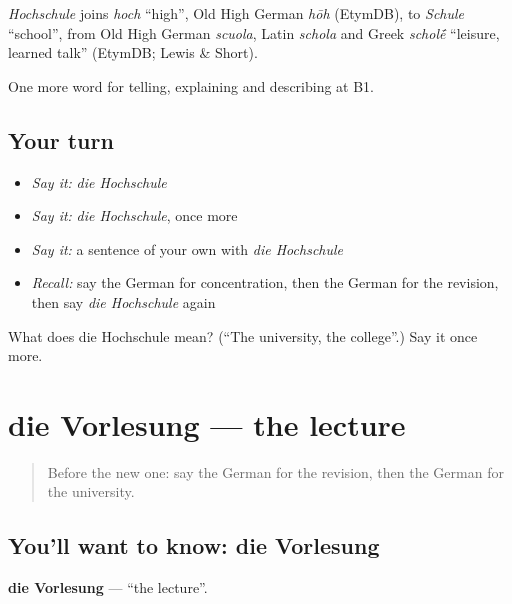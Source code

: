 \begin{cousinweb}
\emph{Hochschule} joins \emph{hoch} \textquotedblleft{}high\textquotedblright{}, Old High German \emph{hōh} (EtymDB), to \emph{Schule} \textquotedblleft{}school\textquotedblright{}, from Old High German \emph{scuola}, Latin \emph{schola} and Greek \emph{schol\'{\={e}}} \textquotedblleft{}leisure, learned talk\textquotedblright{} (EtymDB; Lewis \& Short).
\end{cousinweb}

\begin{grammarlens}[title={What you've built}]
One more word for telling, explaining and describing at B1.
\end{grammarlens}

\subsection*{Your turn}
\begin{itemize}
\raggedright
  \item \emph{Say it:} \emph{die Hochschule}
  \item \emph{Say it:} \emph{die Hochschule}, once more
  \item \emph{Say it:} a sentence of your own with \emph{die Hochschule}
  \item \emph{Recall:} say the German for concentration, then the German for the revision, then say \emph{die Hochschule} again
\end{itemize}

\begin{tcolorbox}[breakable,colback=teal!4,colframe=teal!35!black,title={Before you move on}]
What does die Hochschule mean? (\textquotedblleft{}The university, the college\textquotedblright{}.) Say it once more.
\end{tcolorbox}
\section[die Vorlesung]{die Vorlesung — the lecture}

\label{lesson:GE-C377-vorlesung}



\begin{quote}
Before the new one: say the German for the revision, then the German for the university.
\end{quote}

\subsection*{You'll want to know: die Vorlesung}
\textbf{die Vorlesung} — \textquotedblleft{}the lecture\textquotedblright{}.


